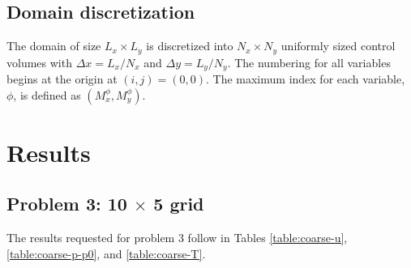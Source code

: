 \documentclass{article}
\begin{document}
\subsection{Domain discretization}

The domain of size $L_x \times L_y$ is discretized into $N_x \times N_y$ uniformly sized control volumes with $\Delta x = L_x / N_x$ and $\Delta y = L_y / N_y$. The numbering for all variables begins at the origin at $(i, j) = (0, 0)$. The maximum index for each variable, $\phi$, is defined as $(M_x^\phi, M_y^\phi)$.

\section{Results}

\subsection{Problem 3: 10 $\times$ 5 grid}

The results requested for problem 3 follow in Tables \ref{table:coarse-u}, \ref{table:coarse-p-p0}, and \ref{table:coarse-T}.
\end{document}
